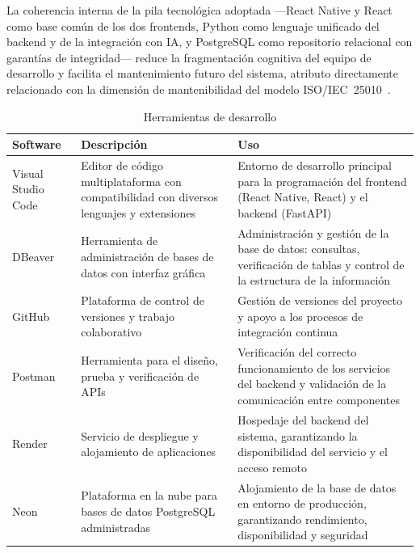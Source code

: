 				La coherencia interna de la pila tecnológica adoptada —React Native y React como base común de los dos frontends, Python como lenguaje unificado del backend y de la integración con IA, y PostgreSQL como repositorio relacional con garantías de integridad— reduce la fragmentación cognitiva del equipo de desarrollo y facilita el mantenimiento futuro del sistema, atributo directamente relacionado con la dimensión de mantenibilidad del modelo ISO/IEC~25010~\cite{ISO25010,Fowler2002,GuerreroUlloa2024}.
				
				\begin{table}[H]
					\centering
					\small
					\caption{Herramientas de desarrollo}
					\label{tab:herramientas}
					\begin{tabular}{p{2.2cm}p{5.1cm}p{7.1cm}}
						\hline
						\textbf{Software} & \textbf{Descripción} & \textbf{Uso} \\
						\hline
						Visual Studio Code & Editor de código multiplataforma con compatibilidad con diversos lenguajes y extensiones & Entorno de desarrollo principal para la programación del frontend (React Native, React) y el backend (FastAPI) \\
						
						DBeaver & Herramienta de administración de bases de datos con interfaz gráfica & Administración y gestión de la base de datos: consultas, verificación de tablas y control de la estructura de la información \\
						
						GitHub & Plataforma de control de versiones y trabajo colaborativo & Gestión de versiones del proyecto y apoyo a los procesos de integración continua \\
						
						Postman & Herramienta para el diseño, prueba y verificación de APIs & Verificación del correcto funcionamiento de los servicios del backend y validación de la comunicación entre componentes \\
						
						Render & Servicio de despliegue y alojamiento de aplicaciones & Hospedaje del backend del sistema, garantizando la disponibilidad del servicio y el acceso remoto \\
						
						Neon & Plataforma en la nube para bases de datos PostgreSQL administradas & Alojamiento de la base de datos en entorno de producción, garantizando rendimiento, disponibilidad y seguridad \\
						\hline
					\end{tabular}
				\end{table}
				\tblnote
				
